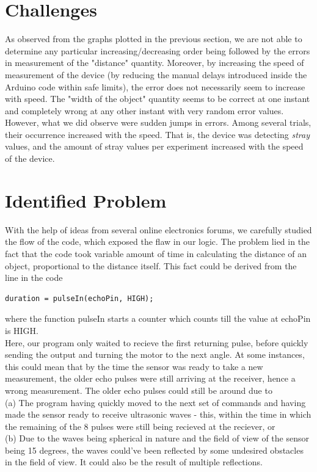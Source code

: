 \section{Challenges}
As observed from the graphs plotted in the previous section, we are not able to determine any particular increasing/decreasing order being followed by the errors in measurement of the "distance" quantity. Moreover, by increasing the speed of measurement of the device (by reducing the manual delays introduced inside the Arduino code within safe limits), the error does not necessarily seem to increase with speed. The "width of the object" quantity seems to be correct at one instant and completely wrong at any other instant with very random error values.\\
However, what we did observe were sudden jumps in errors. Among several trials, their occurrence increased with the speed. That is, the device was detecting \textit{stray} values, and the amount of stray values per experiment increased with the speed of the device. 
\section{Identified Problem}
With the help of ideas from several online electronics forums, we carefully studied the flow of the code, which exposed the flaw in our logic. The problem lied in the fact that the code took variable amount of time in calculating the distance of an object, proportional to the distance itself. This fact could be derived from the line in the code\begin{verbatim}duration = pulseIn(echoPin, HIGH);\end{verbatim} where the function pulseIn starts a counter which counts till the value at echoPin is HIGH.\\
Here, our program only waited to recieve the first returning pulse, before quickly sending the output and turning the motor to the next angle. At some instances, this could mean that by the time the sensor was ready to take a new measurement, the older echo pulses were still arriving at the receiver, hence a wrong measurement. The older echo pulses could still be around due to \\
(a) The program having quickly moved to the next set of commands and having made the sensor ready to receive ultrasonic waves - this, within the time in which the remaining of the 8 pulses were still being recieved at the reciever, or \\
(b) Due to the waves being spherical in nature and the field of view of the sensor being 15 degrees, the waves could've been reflected by some undesired obstacles in the field of view. It could also be the result of multiple reflections.
